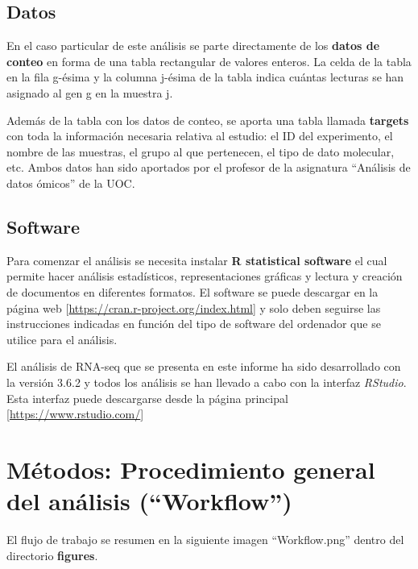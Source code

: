 \documentclass[]{article}
\begin{document}
\hypertarget{datos}{%
\subsection{Datos}\label{datos}}

En el caso particular de este análisis se parte directamente de los
\textbf{datos de conteo} en forma de una tabla rectangular de valores
enteros. La celda de la tabla en la fila g-ésima y la columna j-ésima de
la tabla indica cuántas lecturas se han asignado al gen g en la muestra
j.

Además de la tabla con los datos de conteo, se aporta una tabla llamada
\textbf{targets} con toda la información necesaria relativa al estudio:
el ID del experimento, el nombre de las muestras, el grupo al que
pertenecen, el tipo de dato molecular, etc. Ambos datos han sido
aportados por el profesor de la asignatura ``Análisis de datos ómicos''
de la UOC.

\hypertarget{software}{%
\subsection{Software}\label{software}}

Para comenzar el análisis se necesita instalar \textbf{R statistical
software} el cual permite hacer análisis estadísticos, representaciones
gráficas y lectura y creación de documentos en diferentes formatos. El
software se puede descargar en la página web
{[}\url{https://cran.r-project.org/index.html}{]} y solo deben seguirse
las instrucciones indicadas en función del tipo de software del
ordenador que se utilice para el análisis.

El análisis de RNA-seq que se presenta en este informe ha sido
desarrollado con la versión 3.6.2 y todos los análisis se han llevado a
cabo con la interfaz \emph{RStudio}. Esta interfaz puede descargarse
desde la página principal {[}\url{https://www.rstudio.com/}{]}

\hypertarget{muxe9todos-procedimiento-general-del-anuxe1lisis-workflow}{%
\section{Métodos: Procedimiento general del análisis
(``Workflow'')}\label{muxe9todos-procedimiento-general-del-anuxe1lisis-workflow}}

El flujo de trabajo se resumen en la siguiente imagen ``Workflow.png''
dentro del directorio \textbf{figures}.
\end{document}
